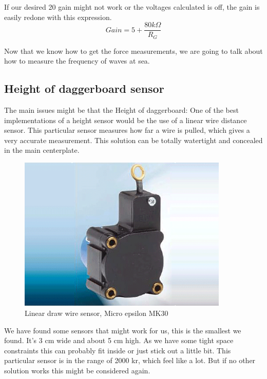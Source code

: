 If our desired 20 gain might not work or the voltages calculated is off, the gain is easily redone with this expression.
\begin{equation}
Gain = 5 + \frac{80k\Omega}{R_G}
\end{equation}


Now that we know how to get the force measurements, we are going to talk about how to measure the frequency of waves at sea.


\subsection{Height of daggerboard sensor}

The main issues might be that the Height of daggerboard: 
One of the best implementations of a height sensor would be the use of a linear wire distance sensor. This particular sensor measures how far a wire is pulled, which gives a very accurate measurement. This solution can be totally watertight and concealed in the main centerplate.  

 \begin{figure}[H]
\begin{center}
	\includegraphics[width = 10cm]{Figures/microepsilon_mk30.png}
	\caption{Linear draw wire sensor, Micro epsilon MK30}
	\label{Draw_sensor}
\end{center}
\end{figure}
 
We have found some sensors that might work for us, this is the smallest we found. It's 3 cm wide and about 5 cm high. As we have some tight space constraints this can probably fit inside or just stick out a little bit. This particular sensor is in the range of 2000 kr, which feel like a lot. But if no other solution works this might be considered again.  


